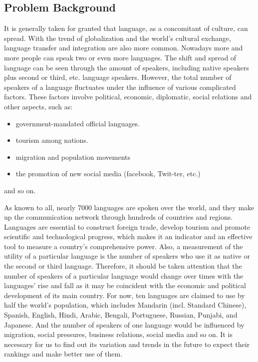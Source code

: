 \documentclass[12pt]{article}  %
\begin{document}
\subsection{Problem Background}
It is generally taken for granted that language, as a concomitant of culture, can spread. With the trend of globalization and the world’s cultural exchange, language transfer and integration are also more common. Nowadays more and more people can speak two or even more languages. The shift and spread of language can be seen through the amount of speakers, including native speakers plus second or third, etc. language speakers. However, the total number of speakers of a language fluctuates under the influence of various complicated factors. These factors involve political, economic, diplomatic, social relations and other aspects, such as: \begin{itemize}
	\item government-mandated official languages.
	\item tourism among nations.
	\item migration and population movements
	\item the promotion of new social media (facebook, Twit-ter, etc.)
\end{itemize}
and so on.

As known to all, nearly 7000 languages are spoken over the world, and they make up the communication network through hundreds of countries and regions. Languages are essential to construct foreign trade, develop tourism and promote scientific and technological progress, which makes it an indicator and an effective tool to measure a country’s comprehensive power. Also, a measurement of the utility of a particular language is the number of speakers who use it as native or the second or third language. Therefore, it should be taken attention that the number of speakers of a particular language would change over times with the languages’ rise and fall as it may be coincident with the economic and political development of its main country. For now, ten languages are claimed to use by half the world’s population, which includes Mandarin (incl. Standard Chinese), Spanish, English, Hindi, Arabic, Bengali, Portuguese, Russian, Punjabi, and Japanese. And the number of speakers of one language would be influenced by migration, social pressures, business relations, social media and so on. It is necessary for us to find out its variation and trends in the future to expect their rankings and make better use of them.
\end{document}
